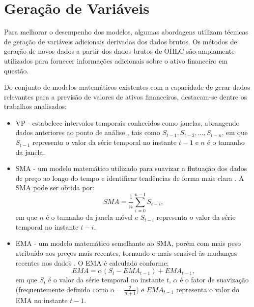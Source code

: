 \section{Geração de Variáveis}
\label{subsec:geracao_novas_variaveis}
Para melhorar o desempenho dos modelos, algumas abordagens utilizam técnicas de geração de variáveis adicionais derivadas dos dados brutos. Os métodos de geração de novos dados a partir dos dados brutos de \ac{OHLC} são amplamente utilizados para fornecer informações adicionais sobre o ativo financeiro em questão.

Do conjunto de modelos matemáticos existentes com a capacidade de gerar dados relevantes para a previsão de valores de ativos financeiros, destacam-se dentre os trabalhos analisados:

\begin{itemize}
    \item \ac{VP} - estabelece intervalos temporais conhecidos como janelas, abrangendo dados anteriores ao ponto de análise \cite{Vinícius_Sistemas, gabriel2023neo}, tais como $S_{t-1}, S_{t-2}, ..., S_{t-n}$, em que $S_{t-1}$ representa o valor da série temporal no instante $t-1$ e $n$ é o tamanho da janela.
    
    \item \ac{SMA} - um modelo matemático utilizado para suavizar a flutuação dos dados de preço ao longo do tempo e identificar tendências de forma mais clara \cite{Vinícius_Sistemas, Ciniro_Econometric}. A \ac{SMA} pode ser obtida por:
    \begin{equation}
    \label{eq:SMA}
        SMA = \frac{1}{n} \sum_{i=0}^{n-1} S_{t-i},
    \end{equation}
    em que $n$ é o tamanho da janela móvel e $S_{t-i}$ representa o valor da série temporal no instante $t-i$.
    
    \item \ac{EMA} - um modelo matemático semelhante ao \ac{SMA}, porém com mais peso atribuído aos preços mais recentes, tornando-o mais sensível às mudanças recentes nos dados \cite{Charlene}. O \ac{EMA} é calculado conforme:
    \begin{equation}
        \label{eq:EMA}
        EMA = \alpha (S_t - EMA_{t-1}) + EMA_{t-1},
    \end{equation}
    em que $S_t$ é o valor da série temporal no instante $t$, $\alpha$ é o fator de suavização (frequentemente definido como $\alpha = \frac{2}{n+1}$) e $EMA_{t-1}$ representa o valor do \ac{EMA} no instante $t-1$.
    

\end{itemize}
